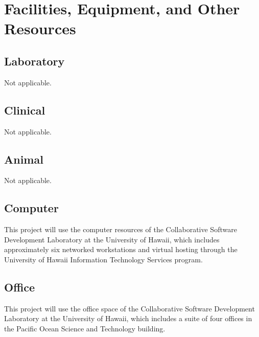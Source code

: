 
\section*{Facilities, Equipment, and Other Resources}


\subsection*{Laboratory}

Not applicable.

\subsection*{Clinical}

Not applicable.

\subsection*{Animal}

Not applicable.

\subsection*{Computer}

This project will use the computer resources of the Collaborative Software
Development Laboratory at the University of Hawaii, which includes
approximately six networked workstations and virtual hosting through
the University of Hawaii Information Technology Services program.

\subsection*{Office}

This project will use the office space of the Collaborative Software
Development Laboratory at the University of Hawaii, which includes a suite
of four offices in the Pacific Ocean Science and Technology building.


